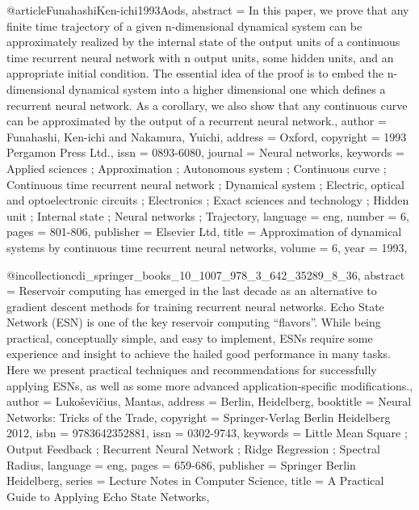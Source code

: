 @article{FunahashiKen-ichi1993Aods,
abstract = {In this paper, we prove that any finite time trajectory of a given n-dimensional dynamical system can be approximately realized by the internal state of the output units of a continuous time recurrent neural network with n output units, some hidden units, and an appropriate initial condition. The essential idea of the proof is to embed the n-dimensional dynamical system into a higher dimensional one which defines a recurrent neural network. As a corollary, we also show that any continuous curve can be approximated by the output of a recurrent neural network.},
author = {Funahashi, Ken-ichi and Nakamura, Yuichi},
address = {Oxford},
copyright = {1993 Pergamon Press Ltd.},
issn = {0893-6080},
journal = {Neural networks},
keywords = {Applied sciences ; Approximation ; Autonomous system ; Continuous curve ; Continuous time recurrent neural network ; Dynamical system ; Electric, optical and optoelectronic circuits ; Electronics ; Exact sciences and technology ; Hidden unit ; Internal state ; Neural networks ; Trajectory},
language = {eng},
number = {6},
pages = {801-806},
publisher = {Elsevier Ltd},
title = {Approximation of dynamical systems by continuous time recurrent neural networks},
volume = {6},
year = {1993},
}

@incollection{cdi_springer_books_10_1007_978_3_642_35289_8_36,
abstract = {Reservoir computing has emerged in the last decade as an alternative to gradient descent methods for training recurrent neural networks. Echo State Network (ESN) is one of the key reservoir computing “flavors”. While being practical, conceptually simple, and easy to implement, ESNs require some experience and insight to achieve the hailed good performance in many tasks. Here we present practical techniques and recommendations for successfully applying ESNs, as well as some more advanced application-specific modifications.},
author = {Lukoševičius, Mantas},
address = {Berlin, Heidelberg},
booktitle = {Neural Networks: Tricks of the Trade},
copyright = {Springer-Verlag Berlin Heidelberg 2012},
isbn = {9783642352881},
issn = {0302-9743},
keywords = {Little Mean Square ; Output Feedback ; Recurrent Neural Network ; Ridge Regression ; Spectral Radius},
language = {eng},
pages = {659-686},
publisher = {Springer Berlin Heidelberg},
series = {Lecture Notes in Computer Science},
title = {A Practical Guide to Applying Echo State Networks},
}

